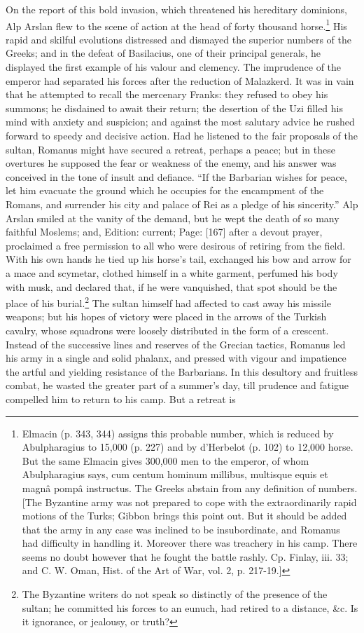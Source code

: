 On the report of this bold invasion, which threatened his hereditary dominions, Alp Arslan flew to the scene of action at the head of forty thousand horse.\footnote{Elmacin (p. 343, 344) assigns this probable number, which is reduced by Abulpharagius to 15,000 (p. 227) and by d\texthebrew{}’Herbelot (p. 102) to 12,000 horse. But the same Elmacin gives 300,000 men to the emperor, of whom Abulpharagius says, cum centum hominum millibus, multisque equis et magnâ pompâ instructus. The Greeks abstain from any definition of numbers. [The Byzantine army was not prepared to cope with the extraordinarily rapid motions of the Turks; Gibbon brings this point out. But it should be added that the army in any case was inclined to be insubordinate, and Romanus had difficulty in handling it. Moreover there was treachery in his camp. There seems no doubt however that he fought the battle rashly. Cp. Finlay, iii. 33; and C. W. Oman, Hist. of the Art of War, vol. 2, p. 217-19.]} His rapid and skilful evolutions distressed and dismayed the superior numbers of the Greeks; and in the defeat of Basilacius, one of their principal generals, he displayed the first example of his valour and clemency. The imprudence of the emperor had separated his forces after the reduction of Malazkerd. It was in vain that he attempted to recall the mercenary Franks: they refused to obey his summons; he disdained to await their return; the desertion of the Uzi filled his mind with anxiety and suspicion; and against the most salutary advice he rushed forward to speedy and decisive action. Had he listened to the fair proposals of the sultan, Romanus might have secured a retreat, perhaps a peace; but in these overtures he supposed the fear or weakness of the enemy, and his answer was conceived in the tone of insult and defiance. \texthebrew{“}If the Barbarian wishes for peace, let him evacuate the ground which he occupies for the encampment of the Romans, and surrender his city and palace of Rei as a pledge of his sincerity.\texthebrew{}” Alp Arslan smiled at the vanity of the demand, but he wept the death of so many faithful Moslems; and, Edition: current; Page: [167] after a devout prayer, proclaimed a free permission to all who were desirous of retiring from the field. With his own hands he tied up his horse\texthebrew{}’s tail, exchanged his bow and arrow for a mace and scymetar, clothed himself in a white garment, perfumed his body with musk, and declared that, if he were vanquished, that spot should be the place of his burial.\footnote{The Byzantine writers do not speak so distinctly of the presence of the sultan; he committed his forces to an eunuch, had retired to a distance, \&c. Is it ignorance, or jealousy, or truth?} The sultan himself had affected to cast away his missile weapons; but his hopes of victory were placed in the arrows of the Turkish cavalry, whose squadrons were loosely distributed in the form of a crescent. Instead of the successive lines and reserves of the Grecian tactics, Romanus led his army in a single and solid phalanx, and pressed with vigour and impatience the artful and yielding resistance of the Barbarians. In this desultory and fruitless combat, he wasted the greater part of a summer\texthebrew{}’s day, till prudence and fatigue compelled him to return to his camp. But a retreat is 